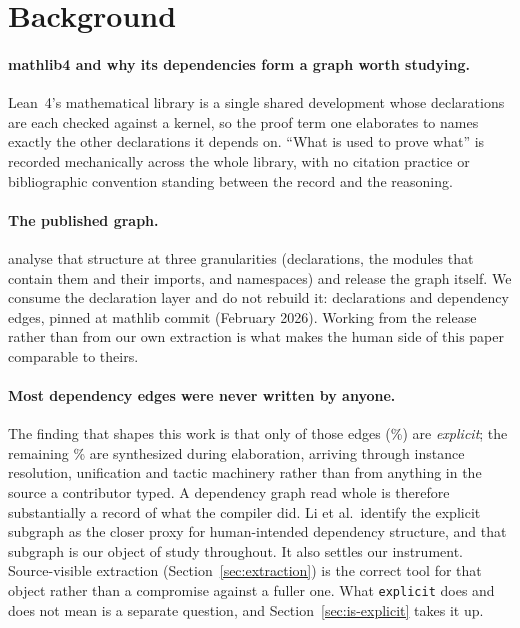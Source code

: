 
\section{Background}
\label{sec:background}

\paragraph{mathlib4 and why its dependencies form a graph worth studying.}
Lean~4's mathematical library is a single shared development whose declarations
are each checked against a kernel, so the proof term one elaborates to names
exactly the other declarations it depends on. ``What is used to prove what'' is
recorded mechanically across the whole library, with no citation practice or
bibliographic convention standing between the record and the reasoning.

\paragraph{The published graph.} \citet{li2026network} analyse that structure at
three granularities (declarations, the modules that contain them and their
imports, and namespaces) and release the graph itself. We consume the
declaration layer and do not rebuild it: \graphDeclarations{} declarations and
\graphEdges{} dependency edges, pinned at mathlib commit \mathlibPin{}
(February 2026). Working from the release rather than from our own extraction
is what makes the human side of this paper comparable to theirs.

\paragraph{Most dependency edges were never written by anyone.} The finding that
shapes this work is that only \explicitEdgeCount{} of those edges
(\explicitEdgePct{}\%) are \emph{explicit}; the remaining
\synthesizedEdgePct{}\% are synthesized during elaboration, arriving through
instance resolution, unification and tactic machinery rather than from anything
in the source a contributor typed. A dependency graph read whole is therefore
substantially a record of what the compiler did. Li et al.\ identify the
explicit subgraph as the closer proxy for human-intended dependency structure,
and that subgraph is our object of study throughout. It also settles our
instrument. Source-visible extraction (Section~\ref{sec:extraction}) is the
correct tool for that object rather than a compromise against a fuller one.
What \texttt{explicit} does and does not mean is a separate question, and
Section~\ref{sec:is-explicit} takes it up.

